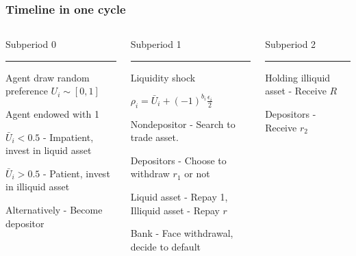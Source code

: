\begin{frame}
    \frametitle{Timeline in one cycle}
    \small
    \begin{columns}[t]
        \begin{column}{0.33\textwidth}
            Subperiod 0 
            \rule{\textwidth}{1pt}
            Agent draw random preference $U_i \sim [0,1]$
            
            \vspace{1em}
            Agent endowed with 1

            \vspace{1em}
            $\bar{U}_i<0.5$ - Impatient, invest in liquid asset  
    
            \vspace{1em}
            $\bar{U}_i>0.5$ - Patient, invest in illiquid asset
           
            \vspace{1em}
            Alternatively - Become depositor
        \end{column}

        \begin{column}{0.33\textwidth}
            Subperiod 1 
            \rule{\textwidth}{1pt}
            Liquidity shock

            $\rho_{i} = \bar{U}_i + (-1)^{b_i}\frac{\epsilon_i}{2}$
            
            \vspace{1em}
            Nondepositor - Search to trade asset. 
            
            \vspace{1em}
            Depositors - Choose to withdraw $r_1$ or not
            
            \vspace{2em}
            Liquid asset - Repay 1, Illiquid asset - Repay $r$
            
            \vspace{1em}
            Bank - Face withdrawal, decide to default
        \end{column}

        \begin{column}{0.33\textwidth}
            Subperiod 2 
            \rule{\textwidth}{1pt}
            Holding illiquid asset - Receive $R$
            
            \vspace{2em}
            Depositors - Receive $r_2$
        \end{column}
    \end{columns}
\end{frame}

